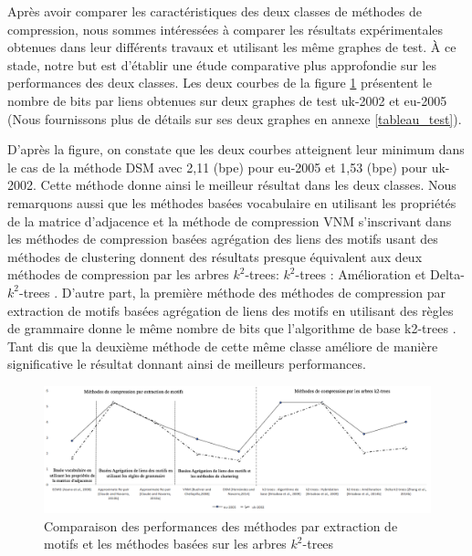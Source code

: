 				
				
				Après avoir comparer les caractéristiques des deux classes de méthodes de compression, nous sommes intéressées à comparer les résultats expérimentales obtenues dans leur différents travaux et utilisant les même graphes de test. À ce stade, notre but est d'établir une étude comparative plus approfondie sur les performances des deux classes. Les deux courbes de la figure \ref{comparaisonVo} présentent le nombre de bits par liens obtenues sur deux graphes de test uk-2002 et eu-2005 (Nous fournissons plus de détails sur ses deux graphes en annexe \ref{tableau_test}).
				
				D'après la figure, on constate que les deux courbes atteignent leur minimum dans le cas de la méthode DSM \citep{hernandez2014compressed} avec 2,11 (bpe) pour eu-2005 et 1,53 (bpe) pour uk-2002. Cette méthode donne ainsi le meilleur résultat dans les deux classes. 	
Nous remarquons aussi que les méthodes basées vocabulaire en utilisant les propriétés de la matrice d'adjacence et la méthode de compression VNM \citep{buehrer2008scalable} s'inscrivant dans les méthodes de compression basées agrégation des liens des motifs usant des méthodes de clustering donnent des résultats presque équivalent aux deux méthodes de compression par les arbres $k^2$-trees: $k^2$-trees : Amélioration \citep{brisaboa2014compact} et Delta-$k^2$-trees  \citep{zhang2014delta}. D'autre part, la première méthode \citep{claude2010fast} des méthodes de compression par extraction de motifs  basées agrégation de liens des motifs en utilisant des règles de grammaire donne le même nombre de bits que l'algorithme de base k2-trees \citep{brisaboa2009k}. Tant dis que la deuxième méthode \citep{claude2010extended} de cette même classe améliore de manière significative le résultat donnant ainsi de meilleurs performances.

\begin{figure}[H]	
				\centering						
				\includegraphics[scale=0.38]{ressources/image/globale.png} 
					\centering
					\caption{Comparaison des performances des méthodes par extraction de motifs et les méthodes basées sur les arbres $k^2$-trees }
					\label{comparaisonVo}
				\end{figure}				
				
